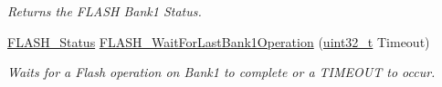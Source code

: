 \begin{DoxyCompactItemize}
\begin{DoxyCompactList}\small\item\em Returns the F\+L\+A\+SH Bank1 Status. \end{DoxyCompactList}\item 
\hyperlink{group___f_l_a_s_h___exported___types_gadc63a6f3404ff1f71229a66915e9cdc0}{F\+L\+A\+S\+H\+\_\+\+Status} \hyperlink{group___f_l_a_s_h___exported___functions_ga470d345c2ea4304f899aa988bdd23824}{F\+L\+A\+S\+H\+\_\+\+Wait\+For\+Last\+Bank1\+Operation} (\hyperlink{_p_e___types_8h_a33594304e786b158f3fb30289278f5af}{uint32\+\_\+t} Timeout)
\begin{DoxyCompactList}\small\item\em Waits for a Flash operation on Bank1 to complete or a T\+I\+M\+E\+O\+UT to occur. \end{DoxyCompactList}\end{DoxyCompactItemize}
